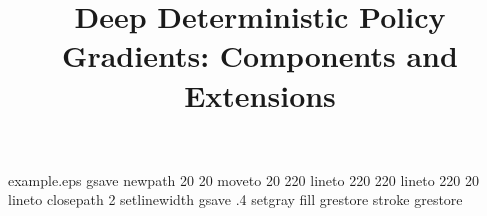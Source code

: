 %
%
%
%
%
\begin{filecontents*}{example.eps}
gsave
newpath
  20 20 moveto
  20 220 lineto
  220 220 lineto
  220 20 lineto
closepath
2 setlinewidth
gsave
  .4 setgray fill
grestore
stroke
grestore
\end{filecontents*}
%
\RequirePackage{fix-cm}
%
\documentclass[smallextended]{svjour3}       %
%
\smartqed  %
%

\usepackage{graphicx}
\usepackage{amsmath}
\usepackage{algorithm}
\usepackage{algorithmic}
\renewcommand{\algorithmicrequire}{\textbf{Initialize:}}

\usepackage{verbatim} %
\usepackage[numbers]{natbib}%

%
%
%
%
%


\title{Deep Deterministic Policy Gradients: Components and Extensions
}
\subtitle{}



